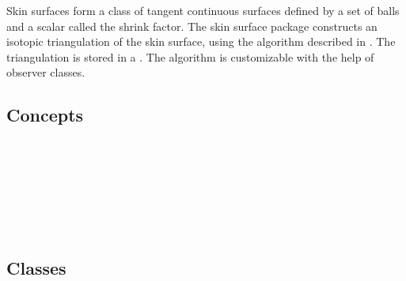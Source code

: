 
\label{chapterSkinSurfaceRef}

Skin surfaces form a class of tangent continuous surfaces defined by a
set of balls and a scalar called the shrink factor. The skin surface
package constructs an isotopic triangulation of the skin surface,
using the algorithm described in \cite{cgal:kv-mssct-05}. The
triangulation is stored in a . The algorithm
is customizable with the help of observer classes.

\subsection*{Concepts}
\\
\\
\\

\\
\\
\\


\subsection*{Classes}
\\

\\


